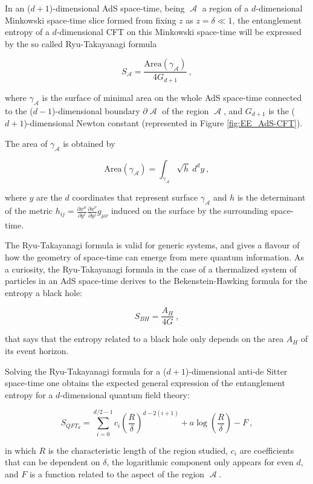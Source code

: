 \documentclass[lettersize,journal]{IEEEtran}
\providecommand{\eq}[2]{
    \begin{equation}
        #2
    \label{eq:#1}
    \end{equation}
}
\DeclareMathOperator{\calA}{\mathcal{A}}
\begin{document}
In an ($d+1$)-dimensional AdS space-time, being $\calA$ a region of a $d$-dimensional Minkowski space-time slice formed from fixing $z$ as $z=\delta \ll 1$, the entanglement entropy of a $d$-dimensional CFT on this Minkowski space-time will be expressed by the so called Ryu-Takayanagi formula
\eq{EE_RT}{
    S_{\calA} = \frac{ \text{Area}(\gamma_{\calA}) }{ 4 G_{d+1} } \ ,
}
\cite{ryu_holographic_2008} where $\gamma_{\calA}$ is the surface of minimal area on the whole AdS space-time connected to the ($d-1$)-dimensional boundary $\partial \calA$ of the region $\calA$, and $G_{d+1}$ is the ($d+1$)-dimensional Newton constant (represented in Figure \ref{fig:EE_AdS-CFT}).

The area of $\gamma_{\calA}$ is obtained by
\eq{EE_RT-area}{
    \text{Area}(\gamma_{\calA}) = \int_{\gamma_{\calA}} \sqrt{h} \ d^{d}y \ ,
}
where $y$ are the $d$ coordinates that represent surface $\gamma_{\calA}$ and $h$ is the determinant of the metric $h_{ij} = \frac{\partial x^\mu}{\partial y^i} \frac{\partial x^\nu}{\partial y^j} g_{\mu\nu}$ induced on the surface by the surrounding space-time.

The Ryu-Takayanagi formula is valid for generic systems, and gives a flavour of how the geometry of space-time can emerge from mere quantum information. As a curiosity, the Ryu-Takayanagi formula in the case of a thermalized system of particles in an AdS space-time derives to the Bekenstein-Hawking formula \cite{bekenstein_black_1973} for the entropy a black hole:
\eq{BH}{
    S_{BH} = \frac{ A_H }{ 4 G } \ ,
}
that says that the entropy related to a black hole only depends on the area $A_H$ of its event horizon.

Solving the Ryu-Takayanagi formula for a ($d+1$)-dimensional anti-de Sitter space-time one obtains the expected general expression of the entanglement entropy for a $d$-dimensional quantum field theory:
\eq{EE}{
    S_{QFT_d} = \sum_{i=0}^{d/2-1} c_i \left( \frac{R}{\delta} \right) ^{d-2(i+1)} + a \log \left( \frac{R}{\delta} \right) - F \ ,
}
\cite{nishioka_entanglement_2018} in which $R$ is the characteristic length of the region studied, $c_i$ are coefficients that can be dependent on $\delta$, the logarithmic component only appears for even $d$, and $F$ is a function related to the aspect of the region $\calA$.


\printbibliography
\end{document}
